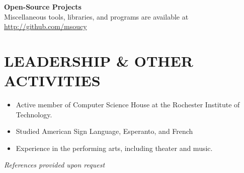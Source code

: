 \documentclass[line]{res}
\newcommand{\project}[2][]{{\bf #2}\hfill #1\\}
\begin{document}
\begin{resume}
	\project                         {Open-Source Projects}
	Miscellaneous tools, libraries, and programs are available at \url{http://github.com/msoucy}

\section{LEADERSHIP \& OTHER ACTIVITIES}
	\begin{itemize}
		\item Active member of Computer Science House at the Rochester Institute of Technology.
		\item Studied American Sign Language, Esperanto, and French
		\item Experience in the performing arts, including theater and music.
	\end{itemize}

\begin{center}\vspace{-0.25in}\emph{References provided upon request\\[8pt]}\end{center}

\end{resume}
\end{document}
